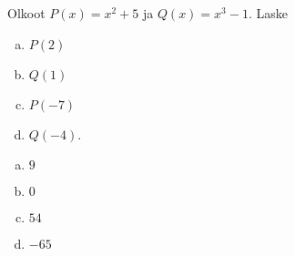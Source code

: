 \begin{tehtava}
    Olkoot $P(x)=x^2+5$ ja $Q(x)=x^3-1$. Laske
    \begin{enumerate}[a)]
        \item $P(2)$
        \item $Q(1)$
        \item $P(-7)$
        \item $Q(-4)$.
    \end{enumerate}
    \begin{vastaus}
        \begin{enumerate}[a)]
            \item $9$ %
            \item $0$ %
            \item $54$ %
            \item $-65$ %
        \end{enumerate}
    \end{vastaus}
\end{tehtava}


